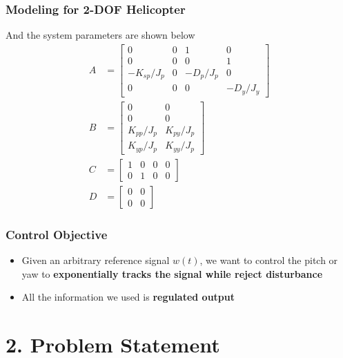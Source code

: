 \documentclass{beamer}
\begin{document}
\begin{frame}[fragile]
	\frametitle{{\color{red} Modeling for 2-DOF Helicopter}}
And the system parameters are shown below
    \begin{align}
        A &= \left[ \begin{matrix}\nonumber
          0 & 0 & 1 & 0 \\
          0 & 0 & 0 & 1 \\
          -K_{s p} / J_{p} & 0 & -D_{p} / J_{p} & 0 \\
          0 & 0 & 0 & -D_{y}/J_{y}
        \end{matrix} \right] \\
        B &= \left[ \begin{matrix}\nonumber
          0 & 0 \\
          0 & 0 \\
          K_{p p} / J_{p} & K_{p y} / J_{p} \\
          K_{y p} / J_{p} & K_{yy} / J_{p}
        \end{matrix} \right] \\
        C &= \left[ \begin{matrix}\nonumber
          1 & 0 & 0 & 0 \\
          0 & 1 & 0 & 0
        \end{matrix} \right] \\
        D &= \left[ \begin{matrix}\nonumber
          0 & 0 \\
          0 & 0
        \end{matrix} \right]
    \end{align}
\end{frame}


\begin{frame}[fragile]
	\frametitle{{\color{red} Control Objective}}
\begin{itemize}
  \item Given an arbitrary reference signal $w(t)$, we want to control the pitch or yaw to \textbf{exponentially tracks the signal while reject disturbance}
  \item All the information we used is \textbf{regulated output}
\end{itemize}

\end{frame}



\section{\large 2. Problem Statement}
\end{document}
